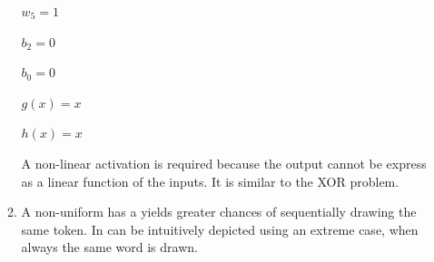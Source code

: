 \documentclass{article}
\begin{document}
\begin{enumerate}[label = (\alph*)]
\begin{enumerate}[label = (\roman*)]
    $w_5=1$
    
    $b_2=0$
    
    $b_0=0$
    
    $g(x) = x$
    
    $h(x) = x$
    
    A non-linear activation is required because the output cannot be express as a linear function of the inputs. It is similar to the XOR problem. 
    
    \item
    A non-uniform has a yields greater chances of sequentially drawing the same token. 
    In can be intuitively depicted using an extreme case, when always the same word is drawn. 
    
	\end{enumerate}
    
\end{enumerate}
\end{document}
